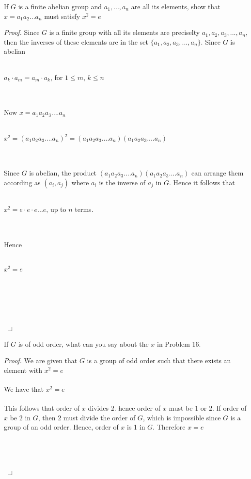 \documentclass[12pt]{article}
\newenvironment{problem}[2][Problem]{\begin{trivlist}
\item[\hskip \labelsep {\bfseries #1}\hskip \labelsep {\bfseries #2.}]}{\end{trivlist}}
\begin{document}
\begin{problem}{2.4.16}
If $G$ is a finite abelian group and $a_1,...,a_n$ are all its elements, show that $x =a_1a_2...a_n$ must satisfy $x^2 = e$
\end{problem}

\begin{proof}
Since $G$ is a finite group with all its elements are preciselty $a_1,a_2,a_3,...,a_n$, then the inverses of these elements are in the set $\{a_1,a_2,a_3,...,a_n\}$. Since $G$ is abelian \\ \\ 
\centerline{$a_k \cdot a_m = a_m \cdot a_k$, for $1 \leq m$, $k \leq n$} \\ \\
Now $x = a_1a_2a_3....a_n$ \\ \\
\centerline{$x^2 = (a_1a_2a_3....a_n)^2 = (a_1a_2a_3....a_n)(a_1a_2a_3....a_n)$} \\ \\
Since $G$ is abelian, the product $(a_1a_2a_3....a_n)(a_1a_2a_3....a_n)$ can arrange them according as $(a_i,a_j)$ where $a_i$ is the inverse of $a_j$ in $G$. Hence it follows that \\ \\
\centerline{$x^2 = e \cdot e \cdot e ... e$, up to $n$ terms.} \\ \\ 
Hence \\ \\
\centerline{$x^2 = e$} \\ \\
\centerline{} \\ \\
\end{proof}

\begin{problem}{2.4.17}
If $G$ is of odd order, what can you say about the $x$ in Problem 16.
\end{problem}

\begin{proof}
We are given that $G$ is a group of odd order such that there exists an element with $x^2 =e$ \\ \\
We have that $x^2 = e$ \\ \\
This follows that order of $x$ divides $2$. hence order of $x$ must be $1$ or $2$. If order of $x$ be $2$ in $G$, then $2$ must divide the order of $G$, which is impossible since $G$ is a group of an odd order. Hence, order of $x$ is 1 in $G$. Therefore $x=e$ \\ \\
\centerline{} \\ \\
\end{proof}



 
\end{document}
